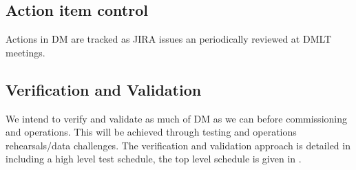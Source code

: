\subsection{Action item control}
Actions in DM are tracked as JIRA issues an periodically reviewed at DMLT meetings.


\subsection {Verification and Validation } \label{sect:vanv}

We intend to verify and validate as much of DM as we can before commissioning and operations.
This will be achieved through testing and operations rehearsals/data challenges.
The verification and validation approach is detailed in  including a high level test schedule,
the top level schedule is given in .
